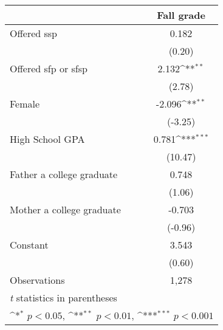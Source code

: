 {
\def\sym#1{\ifmmode^{#1}\else\(^{#1}\)\fi}
\begin{tabular}{l*{1}{c}}
\hline\hline
                &\multicolumn{1}{c}{Fall grade}\\
\hline
Offered ssp     &    0.182         \\
                &   (0.20)         \\
Offered sfp or sfsp&    2.132\sym{**} \\
                &   (2.78)         \\
Female          &   -2.096\sym{**} \\
                &  (-3.25)         \\
High School GPA &    0.781\sym{***}\\
                &  (10.47)         \\
Father a college graduate&    0.748         \\
                &   (1.06)         \\
Mother a college graduate&   -0.703         \\
                &  (-0.96)         \\
Constant        &    3.543         \\
                &   (0.60)         \\
\hline
Observations    &    1,278         \\
\hline\hline
\multicolumn{2}{l}{\footnotesize \textit{t} statistics in parentheses}\\
\multicolumn{2}{l}{\footnotesize \sym{*} \(p<0.05\), \sym{**} \(p<0.01\), \sym{***} \(p<0.001\)}\\
\end{tabular}
}
